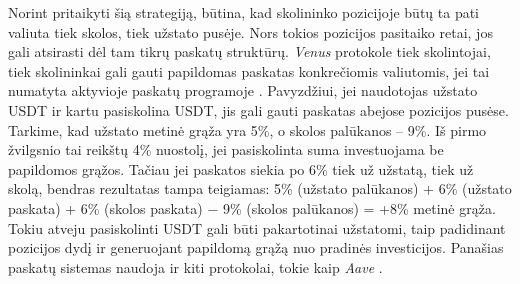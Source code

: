 \documentclass[]{VUMIFTemplateClass}
\begin{document}

Norint pritaikyti šią strategiją, būtina, kad skolininko pozicijoje būtų ta pati valiuta tiek skolos, tiek užstato pusėje. Nors tokios pozicijos pasitaiko retai, jos gali atsirasti dėl tam tikrų paskatų struktūrų. \textit{Venus} protokole tiek skolintojai, tiek skolininkai gali gauti papildomas paskatas konkrečiomis valiutomis, jei tai numatyta aktyvioje paskatų programoje \cite{venusrewards}. Pavyzdžiui, jei naudotojas užstato USDT ir kartu pasiskolina USDT, jis gali gauti paskatas abejose pozicijos pusėse. Tarkime, kad užstato metinė grąža yra 5\%, o skolos palūkanos – 9\%. Iš pirmo žvilgsnio tai reikštų 4\% nuostolį, jei pasiskolinta suma investuojama be papildomos grąžos. Tačiau jei paskatos siekia po 6\% tiek už užstatą, tiek už skolą, bendras rezultatas tampa teigiamas: 5\% (užstato palūkanos) + 6\% (užstato paskata) + 6\% (skolos paskata) − 9\% (skolos palūkanos) = +8\% metinė grąža. Tokiu atveju pasiskolinti USDT gali būti pakartotinai užstatomi, taip padidinant pozicijos dydį ir generuojant papildomą grąžą nuo pradinės investicijos. Panašias paskatų sistemas naudoja ir kiti protokolai, tokie kaip \textit{Aave} \cite{aaveincentives}.
\end{document}
